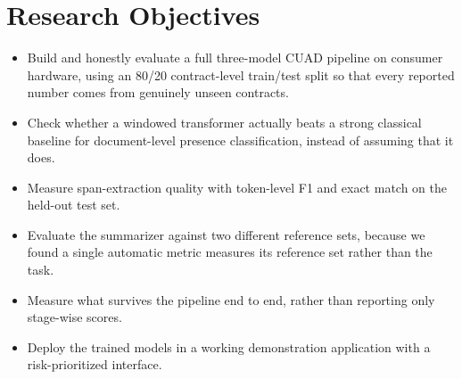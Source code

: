 \section{Research Objectives}
\begin{itemize}[itemsep=2pt]
  \item Build and honestly evaluate a full three-model CUAD pipeline on consumer hardware, using an 80/20 contract-level train/test split so that every reported number comes from genuinely unseen contracts.
  \item Check whether a windowed transformer actually beats a strong classical baseline for document-level presence classification, instead of assuming that it does.
  \item Measure span-extraction quality with token-level F1 and exact match on the held-out test set.
  \item Evaluate the summarizer against two different reference sets, because we found a single automatic metric measures its reference set rather than the task.
  \item Measure what survives the pipeline end to end, rather than reporting only stage-wise scores.
  \item Deploy the trained models in a working demonstration application with a risk-prioritized interface.
\end{itemize}

